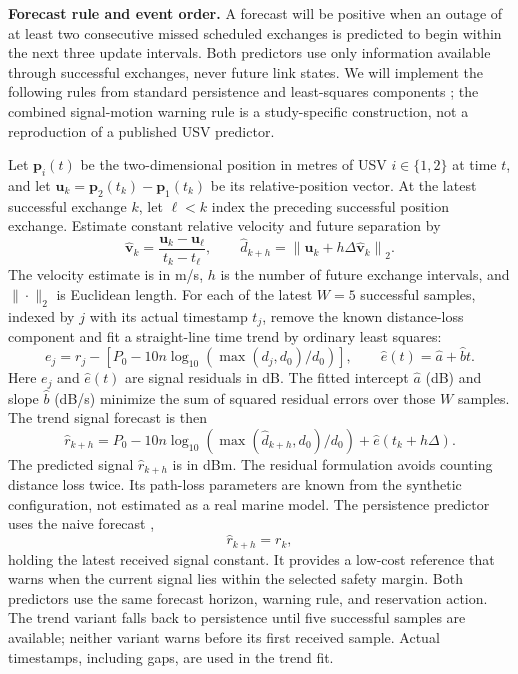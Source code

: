 \textbf{Forecast rule and event order.}
A forecast will be positive when an outage of at least two consecutive missed scheduled exchanges is predicted to begin within the next three update intervals. Both predictors use only information available through successful exchanges, never future link states. We will implement the following rules from standard persistence and least-squares components \cite{hyndman2021forecasting,nistLeastSquares}; the combined signal-motion warning rule is a study-specific construction, not a reproduction of a published USV predictor.

Let $\boldsymbol p_i(t)$ be the two-dimensional position in metres of USV $i\in\{1,2\}$ at time $t$, and let $\boldsymbol u_k=\boldsymbol p_2(t_k)-\boldsymbol p_1(t_k)$ be its relative-position vector. At the latest successful exchange $k$, let $\ell<k$ index the preceding successful position exchange. Estimate constant relative velocity and future separation by
\begin{equation}
\label{eq:motion-forecast}
\widehat{\boldsymbol v}_k=\frac{\boldsymbol u_k-\boldsymbol u_\ell}{t_k-t_\ell},
\qquad
\hat d_{k+h}=\left\|\boldsymbol u_k+h\Delta\widehat{\boldsymbol v}_k\right\|_2.
\end{equation}
The velocity estimate is in m/s, $h$ is the number of future exchange intervals, and $\|\cdot\|_2$ is Euclidean length. For each of the latest $W=5$ successful samples, indexed by $j$ with its actual timestamp $t_j$, remove the known distance-loss component and fit a straight-line time trend by ordinary least squares:
\begin{equation}
\label{eq:signal-residual}
e_j=r_j-\left[P_0-10n\log_{10}\!\left(\max(d_j,d_0)/d_0\right)\right],
\qquad \hat e(t)=\hat a+\hat b t.
\end{equation}
Here $e_j$ and $\hat e(t)$ are signal residuals in dB. The fitted intercept $\hat a$ (dB) and slope $\hat b$ (dB/s) minimize the sum of squared residual errors over those $W$ samples. The trend signal forecast is then
\begin{equation}
\label{eq:trend-forecast}
\hat r_{k+h}=P_0-10n\log_{10}\!\left(\max(\hat d_{k+h},d_0)/d_0\right)+\hat e(t_k+h\Delta).
\end{equation}
The predicted signal $\hat r_{k+h}$ is in dBm. The residual formulation avoids counting distance loss twice. Its path-loss parameters are known from the synthetic configuration, not estimated as a real marine model. The persistence predictor uses the naive forecast \cite{hyndman2021forecasting},
\begin{equation}
\label{eq:persistence-forecast}
\hat r_{k+h}=r_k,
\end{equation}
holding the latest received signal constant. It provides a low-cost reference that warns when the current signal lies within the selected safety margin. Both predictors use the same forecast horizon, warning rule, and reservation action. The trend variant falls back to persistence until five successful samples are available; neither variant warns before its first received sample. Actual timestamps, including gaps, are used in the trend fit.


